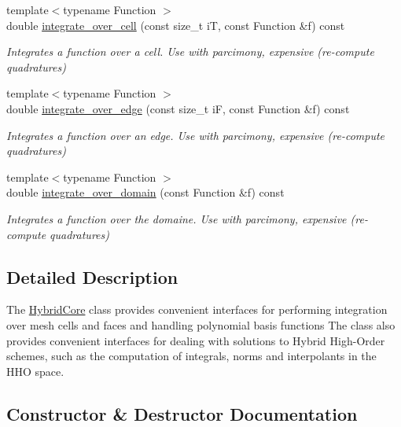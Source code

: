 \begin{DoxyCompactItemize}
{\footnotesize template$<$typename Function $>$ }\\double \hyperlink{group__HybridCore_ga64ffbc44306e06018efe3cea5a62f652}{integrate\+\_\+over\+\_\+cell} (const size\+\_\+t iT, const Function \&f) const
\begin{DoxyCompactList}\small\item\em Integrates a function over a cell. Use with parcimony, expensive (re-\/compute quadratures) \end{DoxyCompactList}\item 
{\footnotesize template$<$typename Function $>$ }\\double \hyperlink{group__HybridCore_ga03f276ea9c905d64662c39b7555d560c}{integrate\+\_\+over\+\_\+edge} (const size\+\_\+t iF, const Function \&f) const
\begin{DoxyCompactList}\small\item\em Integrates a function over an edge. Use with parcimony, expensive (re-\/compute quadratures) \end{DoxyCompactList}\item 
{\footnotesize template$<$typename Function $>$ }\\double \hyperlink{group__HybridCore_gab058c4e54d1e33c49e537b8d0f602848}{integrate\+\_\+over\+\_\+domain} (const Function \&f) const
\begin{DoxyCompactList}\small\item\em Integrates a function over the domaine. Use with parcimony, expensive (re-\/compute quadratures) \end{DoxyCompactList}\end{DoxyCompactItemize}


\subsection{Detailed Description}
The \hyperlink{classHArDCore2D_1_1HybridCore}{Hybrid\+Core} class provides convenient interfaces for performing integration over mesh cells and faces and handling polynomial basis functions The class also provides convenient interfaces for dealing with solutions to Hybrid High-\/\+Order schemes, such as the computation of integrals, norms and interpolants in the H\+HO space. 

\subsection{Constructor \& Destructor Documentation}
\mbox{\label{classHArDCore2D_1_1HybridCore_ae189b44b4574688e4ae5c59d853317ab}} 
